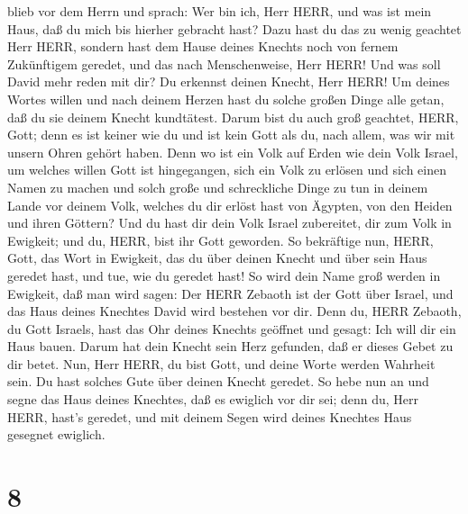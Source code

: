 blieb vor dem Herrn und sprach: Wer bin ich, Herr HERR, und was ist mein
Haus, daß du mich bis hierher gebracht hast?  Dazu hast du
das zu wenig geachtet Herr HERR, sondern hast dem Hause deines Knechts
noch von fernem Zukünftigem geredet, und das nach Menschenweise, Herr
HERR!  Und was soll David mehr reden mit dir? Du erkennst
deinen Knecht, Herr HERR!  Um deines Wortes willen und nach
deinem Herzen hast du solche großen Dinge alle getan, daß du sie deinem
Knecht kundtätest.  Darum bist du auch groß geachtet, HERR,
Gott; denn es ist keiner wie du und ist kein Gott als du, nach allem,
was wir mit unsern Ohren gehört haben.  Denn wo ist ein
Volk auf Erden wie dein Volk Israel, um welches willen Gott ist
hingegangen, sich ein Volk zu erlösen und sich einen Namen zu machen und
solch große und schreckliche Dinge zu tun in deinem Lande vor deinem
Volk, welches du dir erlöst hast von Ägypten, von den Heiden und ihren
Göttern?  Und du hast dir dein Volk Israel zubereitet, dir
zum Volk in Ewigkeit; und du, HERR, bist ihr Gott geworden.
 So bekräftige nun, HERR, Gott, das Wort in Ewigkeit, das
du über deinen Knecht und über sein Haus geredet hast, und tue, wie du
geredet hast!  So wird dein Name groß werden in Ewigkeit,
daß man wird sagen: Der HERR Zebaoth ist der Gott über Israel, und das
Haus deines Knechtes David wird bestehen vor dir.  Denn du,
HERR Zebaoth, du Gott Israels, hast das Ohr deines Knechts geöffnet und
gesagt: Ich will dir ein Haus bauen. Darum hat dein Knecht sein Herz
gefunden, daß er dieses Gebet zu dir betet.  Nun, Herr
HERR, du bist Gott, und deine Worte werden Wahrheit sein. Du hast
solches Gute über deinen Knecht geredet.  So hebe nun an
und segne das Haus deines Knechtes, daß es ewiglich vor dir sei; denn
du, Herr HERR, hast's geredet, und mit deinem Segen wird deines Knechtes
Haus gesegnet ewiglich.

\hypertarget{section-7}{%
\section{8}\label{section-7}}


